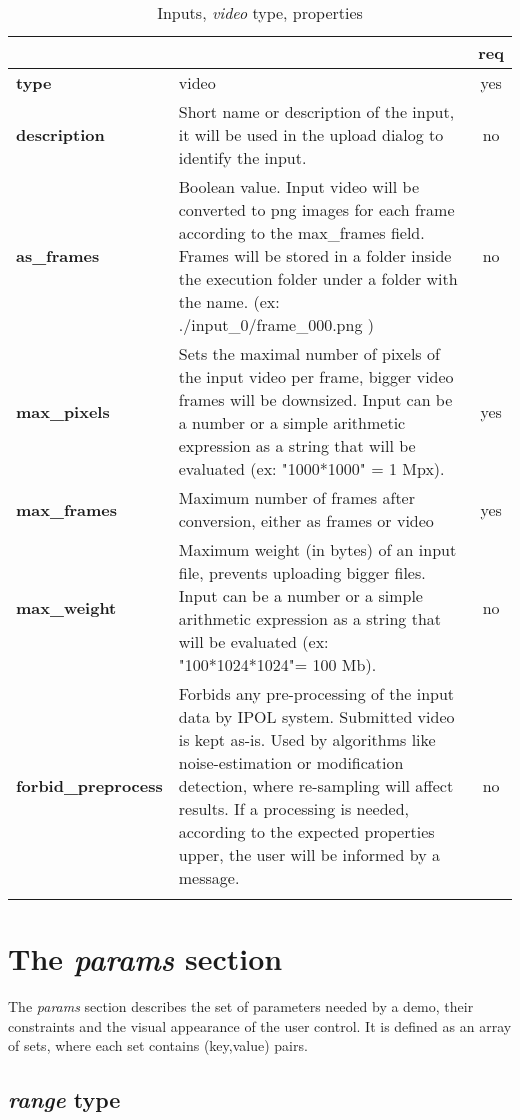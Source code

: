 \begin{longtable}{|>{\bf}L{\linewidth}|L{\linewidth}|c|}
\hline
{}     &  & {\bf req} \tabularnewline 
\hline \hline
 type         & video & yes \\ \hline
 description  & Short name or description of the input, it will be used in the upload dialog to identify the input. & no \\ \hline
 as\_frames & Boolean value. Input video will be converted to png images for each frame according to the max\_frames field. Frames
 will be stored in a folder inside the execution folder under a folder with the name. (ex: ./input\_0/frame\_000.png ) & no \\ \hline
 max\_pixels   &  Sets the maximal number of pixels of the input video per frame, 
bigger video frames will be downsized. 
Input can be a number or a simple arithmetic expression as a string that will be evaluated (ex: "1000*1000" = 1 Mpx).  & yes \\ \hline 
 max\_frames  &  Maximum number of frames after conversion, either as frames or video & yes \\ \hline
 max\_weight   & Maximum weight (in bytes) of an input file, prevents uploading bigger files.
Input can be a number or a simple arithmetic expression as a string that will be evaluated (ex: "100*1024*1024"= 100 Mb). & no \\ \hline
forbid\_preprocess         & Forbids any pre-processing of the input data by IPOL system. 
Submitted video is kept as-is.
Used by algorithms like noise-estimation or modification detection, where re-sampling will affect results. 
If a processing is needed, according to the expected properties upper, the user will be informed by a message.
& no \\ \hline
\caption{Inputs, \emph{video} type, properties}
\end{longtable}

\section{The \emph{params} section}
The \emph{params} section describes the set of parameters needed by a demo, their 
constraints and the visual appearance of the user control. It is defined as an array of sets, 
where each set contains (key,value) pairs.


\subsection{ \emph{range} type}

